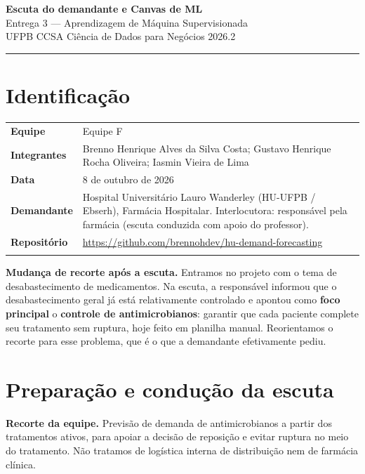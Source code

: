 \documentclass[11pt,a4paper]{article}
\newcommand{\campo}[2]{\textbf{#1} & #2 \\ \addlinespace[2pt]}
\begin{document}
\begin{center}
    {\LARGE\bfseries\color{azulmls} Escuta do demandante e Canvas de ML}\\[3pt]
    {\large Entrega 3 --- Aprendizagem de Máquina Supervisionada}\\[2pt]
    {\normalsize UFPB \textperiodcentered{} CCSA \textperiodcentered{} Ciência de Dados para Negócios \textperiodcentered{} 2026.2}
\end{center}

\vspace{3pt}
\hrule
\vspace{6pt}

\section{Identificação}
\begin{tabularx}{\textwidth}{@{}L X@{}}
\campo{Equipe}{Equipe F}
\campo{Integrantes}{Brenno Henrique Alves da Silva Costa; Gustavo Henrique Rocha Oliveira; Iasmin Vieira de Lima}
\campo{Data}{8 de outubro de 2026}
\campo{Demandante}{Hospital Universitário Lauro Wanderley (HU-UFPB / Ebserh), Farmácia Hospitalar. Interlocutora: responsável pela farmácia (escuta conduzida com apoio do professor).}
\campo{Repositório}{\url{https://github.com/brennohdev/hu-demand-forecasting}}
\end{tabularx}

\begin{tcolorbox}[colback=azulmls!6, colframe=azulmls!50, boxrule=0.5pt, arc=2pt, left=6pt, right=6pt, top=4pt, bottom=4pt]
\footnotesize \textbf{Mudança de recorte após a escuta.} Entramos no projeto com o tema de desabastecimento de medicamentos. Na escuta, a responsável informou que o desabastecimento geral já está relativamente controlado e apontou como \textbf{foco principal} o \textbf{controle de antimicrobianos}: garantir que cada paciente complete seu tratamento sem ruptura, hoje feito em planilha manual. Reorientamos o recorte para esse problema, que é o que a demandante efetivamente pediu.
\end{tcolorbox}

\section{Preparação e condução da escuta}

\textbf{Recorte da equipe.} Previsão de demanda de antimicrobianos a partir dos tratamentos ativos, para apoiar a decisão de reposição e evitar ruptura no meio do tratamento. Não tratamos de logística interna de distribuição nem de farmácia clínica.
\end{document}

